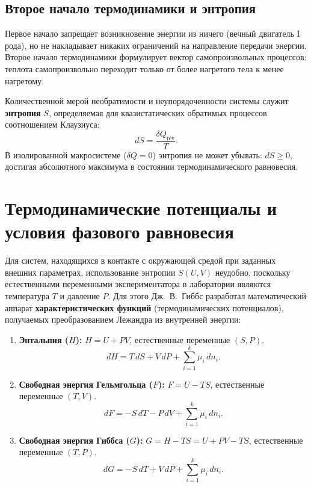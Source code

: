 \documentclass[12pt,a4paper]{article}
\begin{document}
\subsection{Второе начало термодинамики и энтропия}
Первое начало запрещает возникновение энергии из ничего (вечный двигатель I рода), но не накладывает никаких ограничений на направление передачи энергии. Второе начало термодинамики формулирует вектор самопроизвольных процессов: теплота самопроизвольно переходит только от более нагретого тела к менее нагретому.

Количественной мерой необратимости и неупорядоченности системы служит \textbf{энтропия} $S$, определяемая для квазистатических обратимых процессов соотношением Клаузиуса:
\begin{equation}
dS = \frac{\delta Q_{\mathrm{rev}}}{T}.
\label{eq:entropy_def}
\end{equation}
В изолированной макросистеме ($\delta Q = 0$) энтропия не может убывать: $dS \ge 0$, достигая абсолютного максимума в состоянии термодинамического равновесия.

\section{Термодинамические потенциалы и условия фазового равновесия}
\label{sec:potentials}

Для систем, находящихся в контакте с окружающей средой при заданных внешних параметрах, использование энтропии $S(U, V)$ неудобно, поскольку естественными переменными экспериментатора в лаборатории являются температура $T$ и давление $P$. Для этого Дж.~В.~Гиббс разработал математический аппарат \textbf{характеристических функций} (термодинамических потенциалов), получаемых преобразованием Лежандра из внутренней энергии:

\begin{enumerate}
    \item \textbf{Энтальпия ($H$):} $H = U + PV$, естественные переменные $(S, P)$.
    \begin{equation}
    dH = T\,dS + V\,dP + \sum_{i=1}^k \mu_i\,dn_i.
    \end{equation}
    \item \textbf{Свободная энергия Гельмгольца ($F$):} $F = U - TS$, естественные переменные $(T, V)$.
    \begin{equation}
    dF = -S\,dT - P\,dV + \sum_{i=1}^k \mu_i\,dn_i.
    \end{equation}
    \item \textbf{Свободная энергия Гиббса ($G$):} $G = H - TS = U + PV - TS$, естественные переменные $(T, P)$.
    \begin{equation}
    dG = -S\,dT + V\,dP + \sum_{i=1}^k \mu_i\,dn_i.
    \label{eq:dg_fundamental}
    \end{equation}
\end{enumerate}
\end{document}
